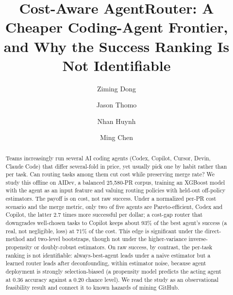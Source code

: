 \documentclass[sigconf,nonacm]{acmart}
\begin{document}
\title{Cost-Aware AgentRouter: A Cheaper Coding-Agent Frontier, and Why the Success Ranking Is Not Identifiable}

\author{Ziming Dong}
\author{Jason Thomo}
\author{Nhan Huynh}
\author{Ming Chen}

\begin{abstract}
Teams increasingly run several AI coding agents (Codex, Copilot, Cursor, Devin, Claude Code) that differ several-fold in price, yet usually pick one by habit rather than per task. Can routing tasks among them cut cost while preserving merge rate? We study this offline on AIDev, a balanced 25,580-PR corpus, training an XGBoost model with the agent as an input feature and valuing routing policies with held-out off-policy estimators. The payoff is on cost, not raw success. Under a normalized per-PR cost scenario and the merge metric, only two of five agents are Pareto-efficient, Codex and Copilot, the latter 2.7 times more successful per dollar; a cost-gap router that downgrades well-chosen tasks to Copilot keeps about 93\% of the best agent's success (a real, not negligible, loss) at 71\% of the cost. This edge is significant under the direct-method and two-level bootstraps, though not under the higher-variance inverse-propensity or doubly-robust estimators. On raw success, by contrast, the per-task ranking is not identifiable: always-best-agent leads under a naive estimator but a learned router leads after deconfounding, within estimator noise, because agent deployment is strongly selection-biased (a propensity model predicts the acting agent at 0.36 accuracy against a 0.20 chance level). We read the study as an observational feasibility result and connect it to known hazards of mining GitHub.
\end{abstract}


\maketitle
\end{document}
